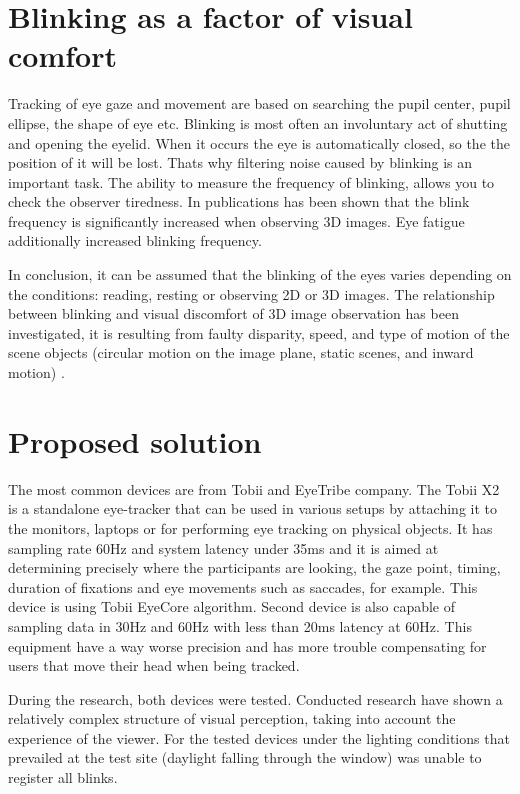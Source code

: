 \documentclass[conference]{IEEEtran}
\begin{document}
\section{Blinking as a factor of visual comfort}
Tracking of eye gaze and movement are based on searching the pupil center, pupil ellipse, the shape of eye etc. Blinking is most often an involuntary act of shutting and opening the eyelid. When it occurs the eye is automatically closed, so the the position of it will be lost. Thats why filtering noise caused by blinking is an important task. The ability to measure the frequency of blinking, allows you to check the observer tiredness. In publications \cite{5606312, 6211573} has been shown that the blink frequency is significantly increased when observing 3D images. Eye fatigue additionally increased blinking frequency. 
\par In conclusion, it can be assumed that the blinking of the eyes varies depending on the conditions: reading, resting or observing 2D or 3D images. The relationship between blinking and visual discomfort of 3D image observation has been investigated, it is resulting from faulty disparity, speed, and type of motion of the scene objects (circular motion on the image plane, static scenes, and inward motion) \cite{00789026}. 

\section{Proposed solution}
The most common devices are from Tobii and EyeTribe company. 
The Tobii X2 is a standalone eye-tracker that can be used in various setups by attaching it to the monitors, laptops or for performing eye tracking on physical objects. It has sampling rate 60Hz and system latency under 35ms and it is aimed at determining precisely where the participants are looking, the gaze point, timing, duration of fixations and eye movements such as saccades, for example. This device is using Tobii EyeCore algorithm. 
Second device is also capable of sampling data in 30Hz and 60Hz with less than 20ms latency at 60Hz. This equipment have a way worse precision and has more trouble compensating for users that move their head when being tracked. 
\newline\par
During the research, both devices were tested.
Conducted research have shown a relatively complex structure of visual perception, taking into account the experience of the viewer.
For the tested devices under the lighting conditions that prevailed at the test site (daylight falling through the window) was unable to register all blinks.
\end{document}
